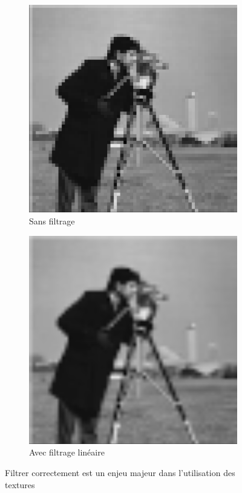 \begin{figure}
    \centering
    \begin{subfigure}[b]{.45\textwidth}
        \includegraphics[width=\textwidth]{contenu/resources/images/cameraman_nearest}
        \caption{Sans filtrage}
    \end{subfigure}
    \hfill
    \begin{subfigure}[b]{.45\textwidth}
        \includegraphics[width=\textwidth]{contenu/resources/images/cameraman_linear}
         \caption{Avec filtrage linéaire}
     \end{subfigure}
    \caption{Filtrer correctement est un enjeu majeur dans l'utilisation des textures}
    \label{fig:filtrage}
\end{figure}

